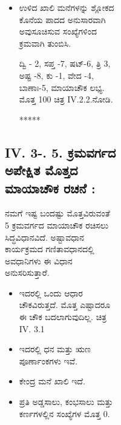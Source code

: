 \begin{figure}[H]
\begin{figure}[H]
\begin{figure}[h]
\begin{figure}[h]
\begin{itemize}
	\textbf{ದ್ವ್ಯಂಕೇ - }ಎರಡನೇ ಮನೆ - 49;

	\textbf{ಗ್ರಹೇ -} ನವಗ್ರಹಗಳು - 9ನೇ ಮನೆ -48;

	\textbf{ಷೋಡಶ -} 16ನೇ ಮನೆ - 47;

	\textbf{ಸಪ್ತ -} ಏಳನೇ ಮನೆ - 46;

	\textbf{ನಾಗೇ -} ಅಷ್ಟದಿಗ್ಗಜಗಳು - 8ನೇ ಮನೆ -45;

	\textbf{ತಿಥೌ -} ತಿಥಿಗಳು 15 - 15ನೇ ಮನೆ -44;

	\textbf{ದಿಶಾಯಾಂ -} ದಶದಿಕ್ಕುಗಳು - 10ನೇ ಮನೆ -43;

	\textbf{ಪ್ರಥಮೇ -} 1ನೇ ಮನೆ - 42

	\item ಉಳಿದ ಖಾಲಿ ಮನೆಗಳನ್ನು ಶ್ಲೋಕದ ಕೊನೆಯ ಪಾದದ ಅನುಸಾರವಾಗಿ ಅವು\break ಸೂಚಿಸುವ ಸಂಖ್ಯೆಗಳಿಂದ ಕ್ರಮವಾಗಿ ತುಂಬಿಸಿ.

	ದ್ವಿ  - 2, ಸಪ್ತ -7, ಷಟ್-6,  ತ್ರಿ 3, ಅಷ್ಟ -8, ಕು -1, ವೇದ -4, ಬಾಣಾಃ-5, ಮಾಯಾಚೌಕ ಲಭ್ಯ. ಮೊತ್ತ 100 ಚಿತ್ರ IV.2.2.ನೋಡಿ.
	\begin{center}
	*****
	\end{center}
\end{itemize}

\subsection*{IV. 3-. 5. ಕ್ರಮವರ್ಗದ ಅಪೇಕ್ಷಿತ ಮೊತ್ತದ ಮಾಯಾಚೌಕ ರಚನೆ :}

ನಮಗೆ ಇಷ್ಟ ಬಂದಷ್ಟು ಮೊತ್ತವಿರುವಂತೆ 5 ಕ್ರಮವರ್ಗದ ಮಾಯಾಚೌಕ ರಚಿಸಲು ಸಿದ್ಧ\break ವಿಧಾನವಿದೆ. ಅಷ್ಟಾವಧಾನ ಕಾರ್ಯಕ್ರಮದ ಗಣಿತಾವಧಾನದಲ್ಲಿ ಅವಧಾನಿಗಳು ಈ ವಿಧಾನ ಅನುಸರಿಸುತ್ತಾರೆ.
\begin{itemize}
	\item ಇದರಲ್ಲಿ ಒಂದು ಆಧಾರ ಚೌಕವಿರುತ್ತದೆ. ಮೊತ್ತ ಎಷ್ಟಾದರೂ ಈ ಚೌಕ ಬದಲಾಗುವುದಿಲ್ಲ. ಚಿತ್ರ IV. 3.1
	\item ಇದರಲ್ಲಿ ಧನ ಮತ್ತು ಋಣ ಪೂರ್ಣಾಂಕಗಳು ಇವೆ.
	\item ಕೇಂದ್ರ ಮನೆ ಖಾಲಿ ಇದೆ.
	\item ಪ್ರತಿ ಅಡ್ಡಸಾಲು, ಕಂಭಸಾಲು ಮತ್ತು ಕರ್ಣಗಳಲ್ಲಿನ ಸಂಖ್ಯೆಗಳ ಮೊತ್ತ 0.

\newpage


\end{itemize}
\end{figure}
\end{figure}
\end{figure}
\end{figure}
